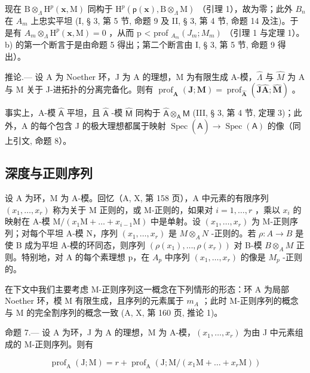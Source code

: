 现在 \(\mathrm{B}\otimes_{\Lambda}\mathrm{H}^{p}(\mathbf{x},\mathrm{M})\) 同构于 \(\mathrm{H}^{p}(\mathsf{p}(\mathbf{x}),\mathrm{B}\otimes_{\Lambda}\mathrm{M})\) （引理 1），故为零；此外 \(B_{n}\) 在 \(A_{m}\) 上忠实平坦 (I, § 3, 第 5 节, 命题 9 及 II, § 3, 第 4 节, 命题 14 及注)。于是有 \(A_{m}\otimes_{\Lambda}\mathrm{H}^{p}(\mathbf{x},\mathrm{M})=0\) ，从而 p \textless{} prof \(_{A_{m}}(J_{m};M_{m})\) （引理 1 与定理 1）。b) 的第一个断言于是由命题 5 得出；第二个断言由 I, § 3, 第 5 节, 命题 9 得出）。

推论.--- 设 A 为 Noether 环，J 为 A 的理想，M 为有限生成 A-模，\(\widehat{\Lambda}\) 与 \(\widehat{M}\) 为 A 与 M 关于 J-进拓扑的分离完备化。则有 \(\operatorname{prof}_{\mathbf{A}}(\mathbf{J};\mathbf{M}) = \operatorname{prof}_{\widehat{\mathbf{A}}}(\widehat{\mathbf{J}}\widehat{\mathbf{A}};\widehat{\mathbf{M}})\) 。

事实上，A-模 \(\widehat{\mathsf{A}}\) 平坦，且 \(\widehat{\mathsf{A}}\) -模 \(\widehat{\mathsf{M}}\) 同构于 \(\widehat{\mathsf{A}}\otimes_{\mathsf{A}}\mathsf{M}\) (III, § 3, 第 4 节, 定理 3)；此外，A 的每个包含 J 的极大理想都属于映射 \(\operatorname{Spec}(\widehat{\mathsf{A}})\to\operatorname{Spec}(\mathsf{A})\) 的像（同上引文, 命题 8）。

\subsection{深度与正则序列}

设 A 为环，M 为 A-模。回忆（A, X, 第 158 页），A 中元素的有限序列 \((x_{1},\ldots,x_{r})\) 称为关于 M 正则的，或 M-正则的，如果对 \(i=1,\ldots,r\) ，乘以 \(x_{i}\) 的映射在 A-模 \(\mathrm{M}/(x_{1}\mathrm{M}+\ldots+x_{i-1}\mathrm{M})\) 中是单射。设 \((x_{1},\ldots,x_{r})\) 为 M-正则序列；对每个平坦 A-模 N，序列 \((x_{1},\ldots,x_{r})\) 是 \(M\otimes_{A}N\) -正则的。若 \(\rho:A\to B\) 是使 B 成为平坦 A-模的环同态，则序列 \((\rho(x_{1}),\ldots,\rho(x_{r}))\) 对 B-模 \(B\otimes_{A}M\) 正则。特别地，对 A 的每个素理想 p，在 \(A_{p}\) 中序列 \((x_{1},\ldots,x_{r})\) 的像是 \(M_{p}\) -正则的。

在下文中我们主要考虑 M-正则序列这一概念在下列情形的形态：环 A 为局部 Noether 环，模 M 有限生成，且序列的元素属于 \(m_{A}\) ；此时 M-正则序列的概念与 M 的完全割序列的概念一致 (A, X, 第 160 页, 推论 1)。

命题 7.--- 设 A 为环，J 为 A 的理想，M 为 A-模，\((x_{1},\ldots,x_{r})\) 为由 J 中元素组成的 M-正则序列。则有

\[
\operatorname{prof} _ {\mathrm{A}} (\mathrm{J}; \mathrm{M}) = r + \operatorname{prof} _ {\mathrm{A}} (\mathrm{J}; \mathrm{M} / (x _ {1} \mathrm{M} + \dots + x _ {r} \mathrm{M}))
\]

